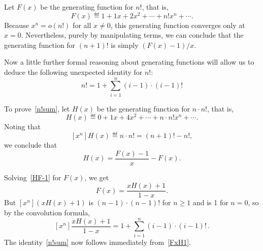 Let $F(x)$ be the generating function for $n!$, that is,
\[
F(x) \eqdef 1 + 1x + 2x^2 + \cdots + n! x^n + \cdots.
\]
Because $x^n = o(n!)$ for all $x \neq 0$, this generating function
converges only at $x=0$.  Nevertheless, purely by manipulating terms,
we can conclude that the generating function for $(n+1)!$ is simply
$(F(x)-1)/x$.

Now a little further formal reasoning about generating functions will
allow us to deduce the following unexpected identity for $n!$:
\begin{equation}\label{n!sum}
n! = 1 + \sum_{i=1}^{n} (i-1) \cdot (i-1)!
\end{equation}

To prove~\eqref{n!sum}, let $H(x)$ be the generating function for $n
\cdot n!$, that is, 
\[
H(x) \eqdef 0 + 1x + 4x^2 + \cdots + n\cdot n! x^n + \cdots.
\]
Noting that 
\[
[x^n]H(x) \eqdef n \cdot n! = (n+1)! - n!,
\]
we conclude that
\begin{equation}\label{HF-1}
H(x) = \frac{F(x) - 1}{x} - F(x).
\end{equation}

Solving~\eqref{HF-1} for $F(x)$, we get
\begin{equation}\label{FxH1}
F(x) = \frac{xH(x)+1}{1-x}.
\end{equation}
But $[x^n](xH(x)+1)$ is $(n-1) \cdot (n-1)!$ for $n \geq 1$ and is 1
for $n=0$, so by the convolution formula,
\[
[x^n]\frac{xH(x)+1}{1-x} = 1 + \sum_{i=1}^{n} (i-1) \cdot (i-1)! \, .
\]
The identity~\eqref{n!sum} now follows immediately from~\eqref{FxH1}.
